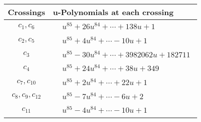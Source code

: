 \documentclass[1p]{elsarticle_modified}
\theoremstyle{definition}
\begin{document}
\begin{tabular}{m{50pt}|m{274pt}}
Crossings & \hspace{64pt}u-Polynomials at each crossing \\
\hline $$\begin{aligned}c_{1},c_{6}\end{aligned}$$&$\begin{aligned}
&u^{85}+26 u^{84}+\cdots+138 u+1
\end{aligned}$\\
\hline $$\begin{aligned}c_{2},c_{5}\end{aligned}$$&$\begin{aligned}
&u^{85}+4 u^{84}+\cdots-10 u+1
\end{aligned}$\\
\hline $$\begin{aligned}c_{3}\end{aligned}$$&$\begin{aligned}
&u^{85}-30 u^{84}+\cdots+3982062 u+182711
\end{aligned}$\\
\hline $$\begin{aligned}c_{4}\end{aligned}$$&$\begin{aligned}
&u^{85}+24 u^{84}+\cdots+38 u+349
\end{aligned}$\\
\hline $$\begin{aligned}c_{7},c_{10}\end{aligned}$$&$\begin{aligned}
&u^{85}+2 u^{84}+\cdots+22 u+1
\end{aligned}$\\
\hline $$\begin{aligned}c_{8},c_{9},c_{12}\end{aligned}$$&$\begin{aligned}
&u^{85}-7 u^{84}+\cdots-6 u+2
\end{aligned}$\\
\hline $$\begin{aligned}c_{11}\end{aligned}$$&$\begin{aligned}
&u^{85}-4 u^{84}+\cdots-10 u+1
\end{aligned}$\\
\hline
\end{tabular}\\~\\
\newpage\renewcommand{\arraystretch}{1}
\end{document}
